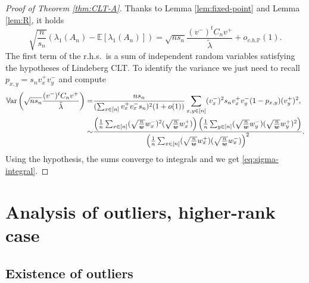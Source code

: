 \documentclass[11pt,oneside]{amsart}
\theoremstyle{plain}
\numberwithin{equation}{section}
\newcommand{\rhs}{{r.h.s.~}}
\newcommand{\E}{\mathbb{E}}
\newcommand{\var}{\mathbb{V}\hspace{-1.pt}{\rm ar}}
\newcommand{\p}{\mathbb{P}}
\newcommand{\centered}{C_n}
\newcommand{\w}{\boldsymbol{w}}
\newcommand{\scaling}{s_n}
\newcommand{\ohp}{o_{v.h.\p}}
\begin{document}
\begin{proof}[Proof of Theorem \ref{thm:CLT-A}]
   Thanks to Lemma \ref{lem:fixed-point} and Lemma \ref{lem:R}, it holds
   \begin{equation}
    \sqrt{\frac{n}{\scaling}}\left(\lambda_1(A_n)- \E[\lambda_1(A_n)] \right)= 
    \sqrt{n \scaling}\frac{(v^-)^t \centered v^+}{\tilde \lambda} + \ohp(1).
   \end{equation}
The first term of the \rhs is a sum of independent random variables satisfying the hypotheses of Lindeberg  CLT. To identify the variance we just need to recall $p_{x,y}=\scaling v_x^+ v_y^-$ and compute
\begin{equation}
\label{eq:computations}
\begin{split}
    \var\left(  \sqrt{n \scaling}\frac{(v^-)^t \centered v^+}{\tilde\lambda}\right)
    = &\frac{n\scaling}{(\sum_{x \in [n]} v_x^+ v_x^- \scaling)^2(1+o(1))}\sum_{x,y \in [n]} (v_x^-)^2\scaling v_x^+ v_y^-(1-p_{x,y})(v_y^+)^2 ,
    \\
    \sim & \frac{\left(\frac1n\sum_{x \in [n]} (\sqrt{\tfrac{n}{\w}}w_x^-)^2(\sqrt{\tfrac{n}{\w}}w_x^+) \right)\left(\frac1n\sum_{y \in [n]}(\sqrt{\tfrac{n}{\w}}w_y^-)(\sqrt{\tfrac{n}{\w}}w_y^+)^2\right)}{\left(\frac1n\sum_{x \in [n]} (\sqrt{\frac{n}{\w}} w_x^+)(\sqrt{\frac{n}{\w}} w_x^-)\right)^2}.
\end{split}
\end{equation}
Using the hypothesis, the sums converge to integrals and we get \eqref{eq:sigma-integral}.
\end{proof}



\section{Analysis of outliers, higher-rank case}
 \label{sec:sp-outliers-r}
 
\subsection{Existence of outliers} 
\label{subsec:sp-existence-outliers-r}
\end{document}
